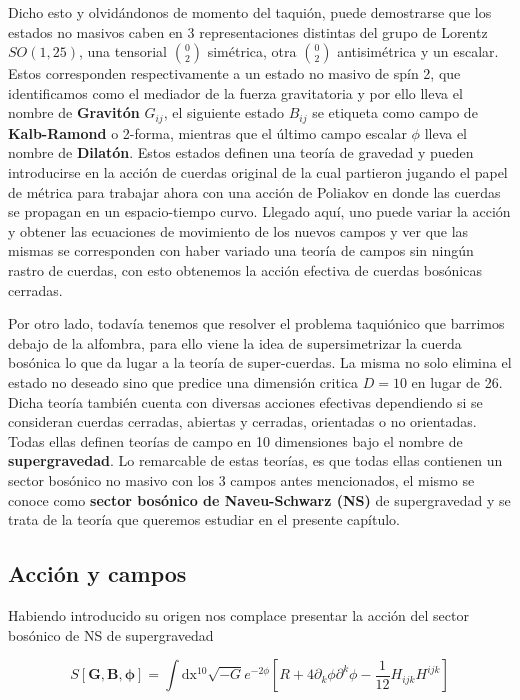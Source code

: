 \documentclass{article}
\numberwithin{equation}{section}
\begin{document}
Dicho esto y olvidándonos de momento del taquión, puede demostrarse que los estados no masivos caben en 3 representaciones distintas del grupo de Lorentz $ SO(1,25) $, una tensorial $ \binom{0}{2} $ simétrica, otra $ \binom{0}{2} $ antisimétrica y un escalar. Estos corresponden respectivamente a un estado no masivo de spín 2, que identificamos como el mediador de la fuerza gravitatoria y por ello lleva el nombre de \textbf{Gravitón} $ G_{i j} $, el siguiente estado $ B_{i j} $ se etiqueta como campo de \textbf{Kalb-Ramond} o 2-forma, mientras que el último campo escalar $ \phi $ lleva el nombre de \textbf{Dilatón}. Estos estados definen una teoría de gravedad y pueden introducirse en la acción de cuerdas original de la cual partieron jugando el papel de métrica para trabajar ahora con una acción de Poliakov en donde las cuerdas se propagan en un espacio-tiempo curvo. Llegado aquí, uno puede variar la acción y obtener las ecuaciones de movimiento de los nuevos campos y ver que las mismas se corresponden con haber variado una teoría de campos sin ningún rastro de cuerdas, con esto obtenemos la acción efectiva de cuerdas bosónicas cerradas. 

Por otro lado, todavía tenemos que resolver el problema taquiónico que barrimos debajo de la alfombra, para ello viene la idea de supersimetrizar la cuerda bosónica lo que da lugar a la teoría de super-cuerdas. La misma no solo elimina el estado no deseado sino que predice una dimensión critica $ D=10 $ en lugar de 26. Dicha teoría también cuenta con diversas acciones efectivas dependiendo si se consideran cuerdas cerradas, abiertas y cerradas, orientadas o no orientadas. Todas ellas definen teorías de campo en 10 dimensiones bajo el nombre de \textbf{supergravedad}. Lo remarcable de estas teorías, es que todas ellas contienen un sector bosónico no masivo con los 3 campos antes mencionados, el mismo se conoce como \textbf{sector bosónico de Naveu-Schwarz (NS)} de supergravedad y se trata de la teoría que queremos estudiar en el presente capítulo. 

\subsection{\textcolor{teal!60!white}{Acción y campos}}

Habiendo introducido su origen nos complace presentar la acción del sector bosónico de NS de supergravedad\\

\begin{boxquation}
\begin{equation}\label{S}
S[\textbf{G},\textbf{B},\pmb{\phi}]=\int\mathrm{dx^{10}} \sqrt{-G}e^{-2\phi}\left[R + 4 \partial_k\phi\partial^k \phi - \frac{1}{12} H_{i j k}H^{i j k}\right]  
\end{equation}
\end{boxquation}
\end{document}
